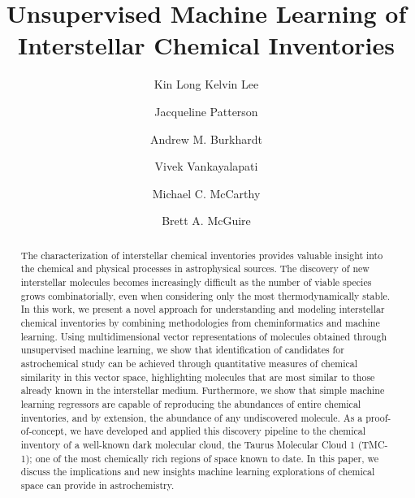 \documentclass[twocolumn]{aastex63}
\begin{document}
\title{Unsupervised Machine Learning of Interstellar Chemical Inventories}
\author{Kin Long Kelvin Lee}
\author{Jacqueline Patterson}
\author{Andrew M. Burkhardt}
\author{Vivek Vankayalapati}
\author{Michael C. McCarthy}
\author{Brett A. McGuire}



\begin{abstract}

The characterization of interstellar chemical inventories provides valuable insight into the chemical and physical processes in astrophysical sources. The discovery of new interstellar molecules becomes increasingly difficult as the number of viable species grows combinatorially, even when considering only the most thermodynamically stable. In this work, we present a novel approach for understanding and modeling interstellar chemical inventories by combining methodologies from cheminformatics and machine learning. Using multidimensional vector representations of molecules obtained through unsupervised machine learning, we show that identification of candidates for astrochemical study can be achieved through quantitative measures of chemical similarity in this vector space, highlighting molecules that are most similar to those already known in the interstellar medium. Furthermore, we show that simple machine learning regressors are capable of reproducing the abundances of entire chemical inventories, and by extension, the abundance of any undiscovered molecule. As a proof-of-concept, we have developed and applied this discovery pipeline to the chemical inventory of a well-known dark molecular cloud, the Taurus Molecular Cloud 1 (TMC-1); one of the most chemically rich regions of space known to date. In this paper, we discuss the implications and new insights machine learning explorations of chemical space can provide in astrochemistry.

\end{abstract}
\end{document}
